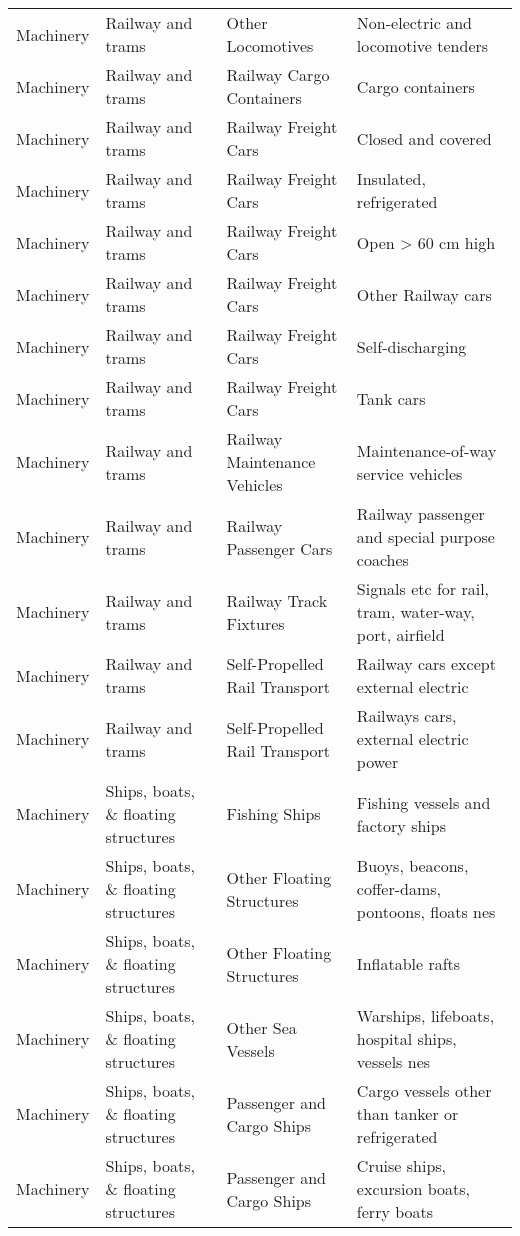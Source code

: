 \begin{appendices}
\begin{xltabular}{\textwidth}{|p{0.07\textwidth}|p{0.25\textwidth}|p{0.28\textwidth}|p{0.3\textwidth}|}
		Machinery & Railway and trams & Other Locomotives & Non-electric and locomotive tenders \\
		Machinery & Railway and trams & Railway Cargo Containers & Cargo containers \\
		Machinery & Railway and trams & Railway Freight Cars & Closed and covered \\
		Machinery & Railway and trams & Railway Freight Cars & Insulated, refrigerated  \\
		Machinery & Railway and trams & Railway Freight Cars & Open > 60 cm high \\
		Machinery & Railway and trams & Railway Freight Cars & Other Railway cars \\
		Machinery & Railway and trams & Railway Freight Cars & Self-discharging \\
		Machinery & Railway and trams & Railway Freight Cars & Tank cars \\
		Machinery & Railway and trams & Railway Maintenance Vehicles & Maintenance-of-way service vehicles \\
		Machinery & Railway and trams & Railway Passenger Cars & Railway passenger and special purpose coaches \\
		Machinery & Railway and trams & Railway Track Fixtures & Signals etc for rail, tram, water-way, port, airfield \\
		Machinery & Railway and trams & Self-Propelled Rail Transport & Railway cars except external electric \\
		Machinery & Railway and trams & Self-Propelled Rail Transport & Railways cars, external electric power \\
		Machinery & Ships, boats, \& floating structures & Fishing Ships & Fishing vessels and factory ships \\
		Machinery & Ships, boats, \& floating structures & Other Floating Structures & Buoys, beacons, coffer-dams, pontoons, floats nes \\
		Machinery & Ships, boats, \& floating structures & Other Floating Structures & Inflatable rafts \\
		Machinery & Ships, boats, \& floating structures & Other Sea Vessels & Warships, lifeboats, hospital ships, vessels nes \\
		Machinery & Ships, boats, \& floating structures & Passenger and Cargo Ships & Cargo vessels other than tanker or refrigerated \\
		Machinery & Ships, boats, \& floating structures & Passenger and Cargo Ships & Cruise ships, excursion boats, ferry boats \\

\end{xltabular}
\end{appendices}
